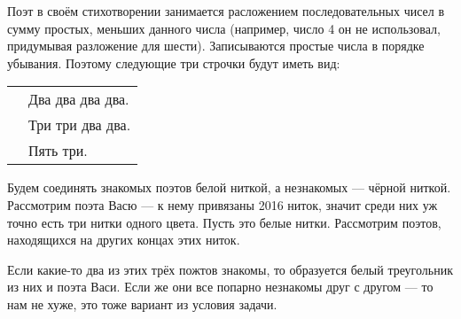 \begin{itemize}

\itA
Поэт в своём стихотворении занимается расложением последовательных чисел в сумму простых, меньших данного числа (например, число 4 он не использовал, придумывая разложение для шести). Записываются простые числа в порядке убывания. Поэтому следующие три строчки будут иметь вид: \\
\begin{tabular}{p{1.7cm}l}
& Два два два два. \\
& Три три два два. \\
& Пять три.
\end{tabular}



\itC Будем соединять знакомых поэтов белой ниткой, а незнакомых — чёрной ниткой. Рассмотрим поэта Васю — к нему привязаны 2016 ниток, значит среди них уж точно есть три нитки одного цвета. Пусть это белые нитки. Рассмотрим поэтов, находящихся на других концах этих ниток.

Если какие-то два из этих трёх пожтов знакомы, то образуется белый треугольник из них и поэта Васи. Если же они все попарно незнакомы друг с другом — то нам не хуже, это тоже вариант из условия задачи.
\end{itemize}